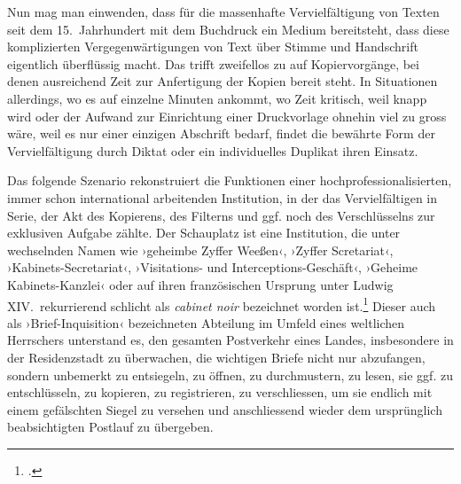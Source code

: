 \documentclass[a4paper,11pt]{article}
\newcommand{\inanf}[1]{›#1‹}
\begin{document}
Nun mag man einwenden, dass für die massenhafte Vervielfältigung von Texten seit dem 15.~Jahrhundert mit dem Buchdruck ein Medium bereitsteht, dass diese komplizierten Vergegenwärtigungen von Text über Stimme und Handschrift eigentlich überflüssig macht. Das trifft zweifellos zu auf Kopiervorgänge, bei denen ausreichend Zeit zur Anfertigung der Kopien bereit steht. In Situationen allerdings, wo es auf einzelne Minuten ankommt, wo Zeit kritisch, weil knapp wird oder der Aufwand zur Einrichtung einer Druckvorlage ohnehin viel zu gross wäre, weil es nur einer einzigen Abschrift bedarf, findet die bewährte Form der Vervielfältigung durch Diktat oder ein individuelles Duplikat ihren Einsatz.

Das folgende Szenario rekonstruiert die Funktionen einer hochprofessionalisierten, immer schon international arbeitenden Institution, in der das Vervielfältigen in Serie, der Akt des Kopierens, des Filterns und ggf. noch des Verschlüsselns zur exklusiven Aufgabe zählte. Der Schauplatz ist eine Institution, die unter wechselnden Namen wie \inanf{geheimbe Zyffer Weeßen}, \inanf{Zyffer Scretariat}, \inanf{Kabinets-Secretariat}, \inanf{Visitations- und Interceptions-Geschäft}, \inanf{Geheime Kabinets-Kanzlei} oder auf ihren französischen Ursprung unter Ludwig XIV.\ rekurrierend schlicht als \emph{cabinet noir} bezeichnet worden ist.\footcite{leeuw:1999} Dieser auch als \inanf{Brief-Inquisition} bezeichneten Abteilung im Umfeld eines weltlichen Herrschers unterstand es, den gesamten Postverkehr eines Landes, insbesondere in der Residenzstadt zu überwachen, die wichtigen Briefe nicht nur abzufangen, sondern unbemerkt zu entsiegeln, zu öffnen, zu durchmustern, zu lesen, sie ggf. zu entschlüsseln, zu kopieren, zu registrieren, zu verschliessen, um sie endlich mit einem gefälschten Siegel zu versehen und anschliessend wieder dem ursprünglich beabsichtigten Postlauf zu übergeben. 

\enlargethispage{5mm}
\end{document}
